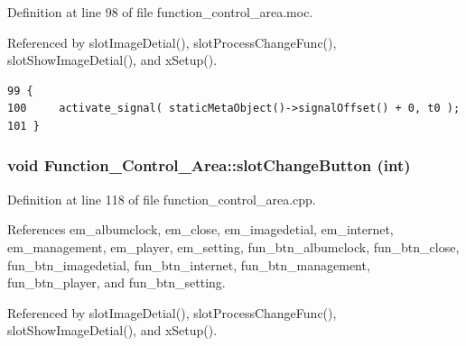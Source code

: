 Definition at line 98 of file function\_\-control\_\-area.moc.

Referenced by slot\-Image\-Detial(), slot\-Process\-Change\-Func(), slot\-Show\-Image\-Detial(), and x\-Setup().



\footnotesize\begin{verbatim}99 {
100     activate_signal( staticMetaObject()->signalOffset() + 0, t0 );
101 }
\end{verbatim}\normalsize 
{}
\subsubsection{\setlength{\rightskip}{0pt plus 5cm}void Function\_\-Control\_\-Area::slot\-Change\-Button (int)\hspace{0.3cm}{\tt  [slot]}}\label{classFunction__Control__Area_Function__Control__Areai1}




Definition at line 118 of file function\_\-control\_\-area.cpp.

References em\_\-albumclock, em\_\-close, em\_\-imagedetial, em\_\-internet, em\_\-management, em\_\-player, em\_\-setting, fun\_\-btn\_\-albumclock, fun\_\-btn\_\-close, fun\_\-btn\_\-imagedetial, fun\_\-btn\_\-internet, fun\_\-btn\_\-management, fun\_\-btn\_\-player, and fun\_\-btn\_\-setting.

Referenced by slot\-Image\-Detial(), slot\-Process\-Change\-Func(), slot\-Show\-Image\-Detial(), and x\-Setup().



